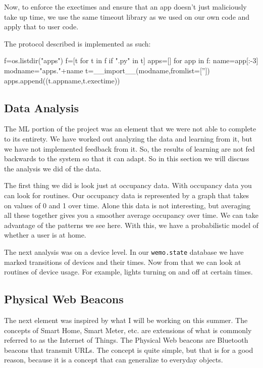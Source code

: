 \documentclass{sig-alternate-05-2015}
\begin{document}
Now, to enforce the exectimes and ensure that an app doesn't just maliciously take up time, we use the same timeout library as we used on our own code and apply that to user code.

The protocol described is implemented as such:
\begin{python}
f=os.listdir("apps")
f=[t for t in f if ".py" in t]
apps=[]
for app in f:
	name=app[:-3]
	modname="apps."+name
	t=__import__(modname,fromlist=['']) 
	apps.append((t.appname,t.exectime))
\end{python}

\subsection{Data Analysis}

The ML portion of the project was an element that we were not able to complete to its entirety. We have worked out analyzing the data and learning from it, but we have not implemented feedback from it. So, the results of learning are not fed backwards to the system so that it can adapt. So in this section we will discuss the analysis we did of the data.

The first thing we did is look just at occupancy data. With occupancy data you can look for routines. Our occupancy data is represented by a graph that takes on values of 0 and 1 over time. Alone this data is not interesting, but averaging all these together gives you a smoother average occupancy over time. We can take advantage of the patterns we see here. With this, we have a probabilistic model of whether a user is at home.

The next analysis was on a device level. In our \texttt{wemo.state} database we have marked transitions of devices and their times. Now from that we can look at routines of device usage. For example, lights turning on and off at certain times.

\subsection{Physical Web Beacons}

The next element was inspired by what I will be working on this summer. The concepts of Smart Home, Smart Meter, etc. are extensions of what is commonly referred to as the Internet of Things. The Physical Web beacons are Bluetooth beacons that transmit URLs. The concept is quite simple, but that is for a good reason, because it is a concept that can generalize to everyday objects.
\end{document}
